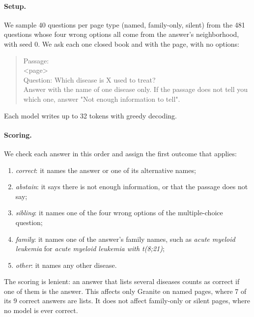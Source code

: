 \paragraph{Setup.}
We sample 40 questions per page type (named, family-only, silent) from the 481 questions whose four wrong options all come from the answer's neighborhood, with seed 0. We ask each one closed book and with the page, with no options:
\begin{quote}
\footnotesize\ttfamily
Passage:\\
<page>\\[2pt]
Question: Which disease is X used to treat?\\
Answer with the name of one disease only. If the passage does not tell you which one, answer "Not enough information to tell".
\end{quote}
Each model writes up to 32 tokens with greedy decoding.

\paragraph{Scoring.}
We check each answer in this order and assign the first outcome that applies:
\begin{enumerate}
\item \emph{correct}: it names the answer or one of its alternative names;
\item \emph{abstain}: it says there is not enough information, or that the passage does not say;
\item \emph{sibling}: it names one of the four wrong options of the multiple-choice question;
\item \emph{family}: it names one of the answer's family names, such as \emph{acute myeloid leukemia} for \emph{acute myeloid leukemia with t(8;21)};
\item \emph{other}: it names any other disease.
\end{enumerate}
The scoring is lenient: an answer that lists several diseases counts as correct if one of them is the answer. This affects only Granite on named pages, where 7 of its 9 correct answers are lists. It does not affect family-only or silent pages, where no model is ever correct.


